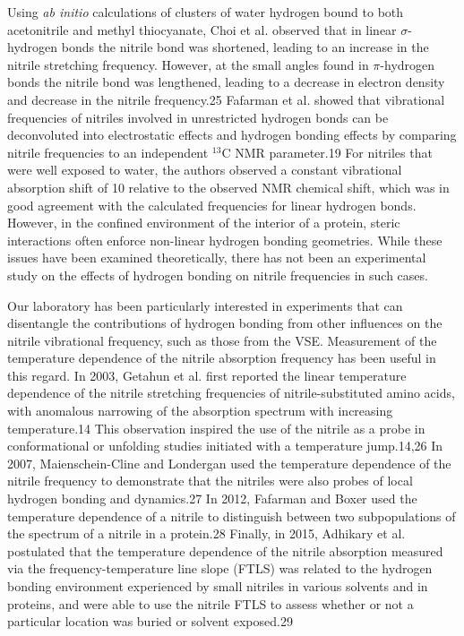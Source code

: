 Using \emph{ab initio} calculations of clusters of water hydrogen bound to both acetonitrile and methyl thiocyanate, Choi et al. observed that in linear $\sigma$-hydrogen bonds the nitrile bond was shortened, leading to an increase in the nitrile stretching frequency.
However, at the small angles found in $\pi$-hydrogen bonds the nitrile bond was lengthened, leading to a decrease in electron density and decrease in the nitrile frequency.25
Fafarman et al. showed that vibrational frequencies of nitriles involved in unrestricted hydrogen bonds can be deconvoluted into electrostatic effects and hydrogen bonding effects by comparing nitrile frequencies to an independent $^{13}$C NMR parameter.19
For nitriles that were well exposed to water, the authors observed a constant vibrational absorption shift of 10 \si{\wn} relative to the observed NMR chemical shift, which was in good agreement with the calculated frequencies for linear hydrogen bonds.
However, in the confined environment of the interior of a protein, steric interactions often enforce non-linear hydrogen bonding geometries.
While these issues have been examined theoretically, there has not been an experimental study on the effects of hydrogen bonding on nitrile frequencies in such cases.

Our laboratory has been particularly interested in experiments that can disentangle the contributions of hydrogen bonding from other influences on the nitrile vibrational frequency, such as those from the VSE.
Measurement of the temperature dependence of the nitrile absorption frequency has been useful in this regard.
In 2003, Getahun et al. first reported the linear temperature dependence of the nitrile stretching frequencies of nitrile-substituted amino acids, with anomalous narrowing of the absorption spectrum with increasing temperature.14
This observation inspired the use of the nitrile as a probe in conformational or unfolding studies initiated with a temperature jump.14,26
In 2007, Maienschein-Cline and Londergan used the temperature dependence of the nitrile frequency to demonstrate that the nitriles were also probes of local hydrogen bonding and dynamics.27
In 2012, Fafarman and Boxer used the temperature dependence of a nitrile to distinguish between two subpopulations of the spectrum of a nitrile in a protein.28
Finally, in 2015, Adhikary et al. postulated that the temperature dependence of the nitrile absorption measured via the frequency-temperature line slope (FTLS) was related to the hydrogen bonding environment experienced by small nitriles in various solvents and in proteins, and were able to use the nitrile FTLS to assess whether or not a particular location was buried or solvent exposed.29

